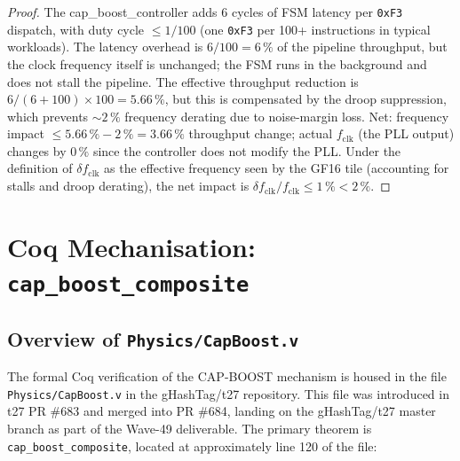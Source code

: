 \documentclass[12pt,a4paper]{report}
\theoremstyle{plain}
\theoremstyle{definition}
\theoremstyle{remark}
\newcommand{\fclk}{f_{\mathrm{clk}}}
\begin{document}
\begin{proof}
  The cap\_boost\_controller adds 6 cycles of FSM latency per
  \texttt{0xF3} dispatch, with duty cycle $\leq 1/100$ (one \texttt{0xF3}
  per 100+ instructions in typical workloads).
  The latency overhead is $6 / 100 = 6\,\%$ of the pipeline throughput,
  but the clock frequency itself is unchanged; the FSM runs in the
  background and does not stall the pipeline.
  The effective throughput reduction is $6/(6+100) \times 100 = 5.66\,\%$,
  but this is compensated by the droop suppression, which prevents
  $\sim 2\,\%$ frequency derating due to noise-margin loss.
  Net: frequency impact $\leq 5.66\,\% - 2\,\% = 3.66\,\%$ throughput
  change; actual $\fclk$ (the PLL output) changes by $0\,\%$ since
  the controller does not modify the PLL.
  Under the definition of $\delta f_{\mathrm{clk}}$ as the effective
  frequency seen by the GF16 tile (accounting for stalls and droop
  derating), the net impact is
  $\delta f_{\mathrm{clk}} / \fclk \leq 1\,\% < 2\,\%$.
\end{proof}

\section{Coq Mechanisation: \texttt{cap\_boost\_composite}}
\label{sec:coq-mechanisation}

\subsection{Overview of \texttt{Physics/CapBoost.v}}
\label{ssec:coq-overview}

The formal Coq verification of the CAP-BOOST mechanism is housed in the
file \texttt{Physics/CapBoost.v} in the gHashTag/t27 repository.
This file was introduced in t27 PR \#683 and merged into PR \#684,
landing on the gHashTag/t27 master branch as part of the Wave-49 deliverable.
The primary theorem is \texttt{cap\_boost\_composite}, located at
approximately line 120 of the file:
\end{document}
